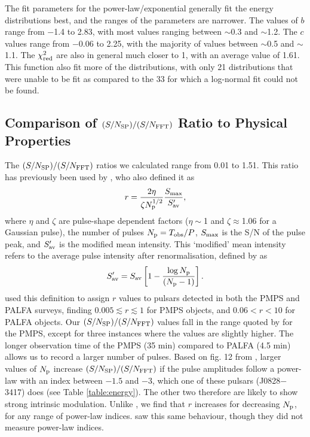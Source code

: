 \documentclass[fleqn,usenatbib]{mnras}
\begin{document}
The fit parameters for the power-law/exponential generally fit the energy distributions best,
and the ranges of the parameters are narrower. The values of $b$ range from $-$1.4 to 2.83,
with most values ranging between $\sim$0.3 and $\sim$1.2. The $c$ values range from $-$0.06 to 
2.25, with the majority of values between $\sim$0.5 and $\sim$1.1. The $\chi_{\rm red}^2$ are also
in general much closer to 1, with an average value of 1.61. This function also fit more of the 
distributions, with only 21 distributions that were unable to be fit as compared to the 33 for 
which a log-normal fit could not be found.

\subsection{Comparison of \texorpdfstring{$(S/N_{\rm SP})/(S/N_{\rm FFT})$}{(SP S/N)/(FFT S/N)} Ratio to Physical Properties}
\label{sp_comp}

The $(S/N_{\rm SP})/(S/N_{\rm FFT})$ ratios we calculated range from 0.01 to 1.51. This ratio has previously been used by \citet{McLaughlin:2003}, who also defined it as
\begin{equation}
r=\frac{2\eta}{\zeta{N_{\rm p}^{1/2}}}\frac{S_{\rm max}}{S_{\rm av}^{\prime}},
\label{eq:intermitt}
\end{equation}
where $\eta$ and $\zeta$ are pulse-shape dependent factors ($\eta\sim$1 and $\zeta\approx$1.06 for a Gaussian pulse), the number of pulses $N_{\rm p}=T_{\rm obs}/P$, $S_{\rm max}$ is the S/N of the pulse peak, and $S_{\rm av}^{\prime}$ is the modified mean intensity. This `modified' mean intensity refers to the average pulse intensity after renormalisation, defined by \citet{McLaughlin:2003} as 
\begin{equation}
S_{\rm av}^{\prime}=S_{\rm av}\left[{1-\frac{\log{N_{\rm p}}}{(N_{\rm p}-1)}}\right].
\label{eq:s_prime}
\end{equation}
\citet{Deneva:2009} used this definition to assign $r$ values to pulsars detected in both the PMPS and PALFA surveys, finding $0.005 \lesssim r \lesssim 1$ for PMPS objects, and $0.06 < r < 10$ for PALFA objects. Our $(S/N_{\rm SP})/(S/N_{\rm FFT})$ values fall in the range quoted by \citet{Deneva:2009} for the PMPS, except for three instances where the values are slightly higher. The longer observation time of the PMPS (35 min) compared to PALFA (4.5 min) allows us to record a larger number of pulses. Based on fig. 12 from \citet{McLaughlin:2003}, larger values of $N_{\rm p}$ increase $(S/N_{\rm SP})/(S/N_{\rm FFT})$ if the pulse amplitudes follow a power-law with an index between $-1.5$ and $-3$, which one of these pulsars (J0828$-$3417) does (see Table \ref{table:energy}). The other two therefore are likely to show strong intrinsic modulation. Unlike \citet{McLaughlin:2003}, we find that $r$ increases for decreasing $N_{\rm p}$, for any range of power-law indices. \citet{Deneva:2009} saw this same behaviour, though they did not measure power-law indices.
\end{document}

